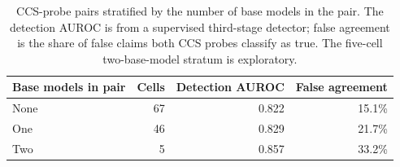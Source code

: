 \begin{table}[!htbp]
\centering
\small
\caption{CCS-probe pairs stratified by the number of base models in the pair. The detection AUROC is from a supervised third-stage detector; false agreement is the share of false claims both CCS probes classify as true. The five-cell two-base-model stratum is exploratory.}
\label{tab:ccs-base-models}
\begin{tabular}{lrrr}
\toprule
Base models in pair & Cells & Detection AUROC & False agreement \\
\midrule
None & 67 & 0.822 & 15.1\% \\
One & 46 & 0.829 & 21.7\% \\
Two & 5 & 0.857 & 33.2\% \\
\bottomrule
\end{tabular}
\end{table}
